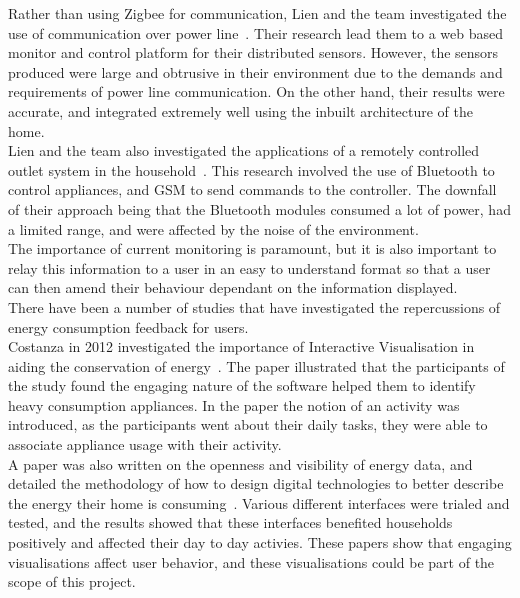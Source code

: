 \documentclass[draft,preprint,12pt,3p]{elsarticle}
\begin{document}
Rather than using Zigbee for communication, Lien and the team investigated the use of communication over power line~\cite{lien2008power}. Their research lead them to a web based monitor and control platform for their distributed sensors. However, the sensors produced were large and obtrusive in their environment due to the demands and requirements of power line communication. On the other hand, their results were accurate, and integrated extremely well using the inbuilt architecture of the home. \\
Lien and the team also investigated the applications of a remotely controlled outlet system in the household~\cite{lien2006remotely}. This research involved the use of Bluetooth to control appliances, and GSM to send commands to the controller. The downfall of their approach being that the Bluetooth modules consumed a lot of power, had a limited range, and were affected by the noise of the environment.\\
The importance of current monitoring is paramount, but it is also important to relay this information to a user in an easy to understand format so that a user can then amend their behaviour dependant on the information displayed.\\
There have been a number of studies that have investigated the repercussions of energy consumption feedback for users.\\
Costanza in 2012 investigated the importance of Interactive Visualisation in aiding the conservation of energy~\cite{costanza2012understanding}. The paper illustrated that the participants of the study found the engaging nature of the software helped them to identify heavy consumption appliances. In the paper the notion of an activity was introduced, as the participants went about their daily tasks, they were able to associate appliance usage with their activity. \\
A paper was also written on the openness and visibility of energy data, and detailed the methodology of how to design digital technologies to better describe the energy their home is consuming~\cite{price2013looking}. Various different interfaces were trialed and tested, and the results showed that these interfaces benefited households positively and affected their day to day activies.
These papers show that engaging visualisations affect user behavior, and these visualisations could be part of the scope of this project.\\
\end{document}
